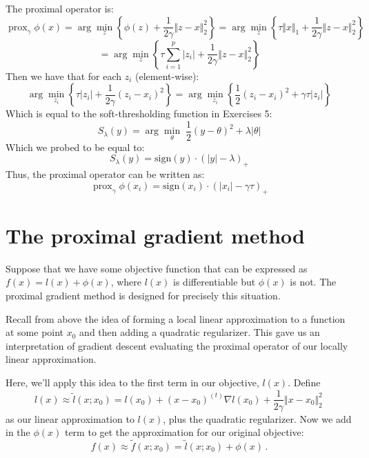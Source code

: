 \documentclass[11 pt]{article}
\newcommand{\prox}{ \mathop{\mathrm{prox}} }
\newcommand{\enorm}[1]{\Vert #1 \Vert_2}
\begin{document}
\begin{enumerate}[label=(\Alph*)]
		The proximal operator is:
		$$
		\prox_{\gamma} \phi(x) = \arg \min_{z } \left\{  \phi(z)+ \frac{1}{2\gamma} \enorm{z - x}^2  \right\} = \arg \min_{z } \left\{  \tau \Vert x \Vert_1+ \frac{1}{2\gamma} \enorm{z - x}^2  \right\} $$
		$$
		= \arg \min_{z } \left\{  \tau \sum_{i=1}^{p} \vert z_i \vert + \frac{1}{2\gamma} \enorm{z - x}^2  \right\} 
		$$
		Then we have that for each $z_i$ (element-wise):
		$$
		\arg \min_{z_i } \left\{  \tau \vert z_i \vert + \frac{1}{2\gamma} (z_i - x_i)^2  \right\} = \arg \min_{z_i } \left\{  \frac{1}{2} (z_i - x_i)^2 + \gamma \tau \vert z_i \vert \right\}  $$
		Which is equal to the soft-thresholding function in Exercises 5:
		$$
		S_\lambda(y) = \arg \min_{\theta} \; \frac{1}{2}(y - \theta)^2 + \lambda | \theta |   $$
		Which we probed to be equal to:
		$$
		S_\lambda(y) = \mbox{sign}(y) \cdot (|y| - \lambda)_+ 
		$$
		Thus, the proximal operator can be written as:
		$$
		\prox_{\gamma} \phi(x_i)  = \mbox{sign}(x_i) \cdot (|x_i| - \gamma \tau)_+ 
		$$
	
	\end{enumerate}
	
	\newpage
	\section{The proximal gradient method}
	
	Suppose that we have some objective function that can be expressed as $f(x) = l(x) + \phi(x)$, where $l(x)$ is differentiable but $\phi(x)$ is not.  The proximal gradient method is designed for precisely this situation.
	
	Recall from above the idea of forming a local linear approximation to a function at some point $x_0$ and then adding a quadratic regularizer.  This gave us an interpretation of gradient descent evaluating the proximal operator of our locally linear approximation.
	
	Here, we'll apply this idea to the first term in our objective, $l(x)$. Define
	$$
	l(x) \approx \tilde{l}(x; x_0) = l(x_0) + (x - x_0)^{(t)} \nabla l(x_0) + \frac{1}{2\gamma} \enorm{x - x_0}^2 \, 
	$$
	as our linear approximation to $l(x)$, plus the quadratic regularizer.  Now we add in the $\phi(x)$ term to get the approximation for our original objective:
	\begin{equation}
	\label{eqn:pg_approx}
	f(x) \approx \tilde{f}(x; x_0) = \tilde{l}(x; x_0) + \phi(x)   \, .
	\end{equation}
	
\end{document}
